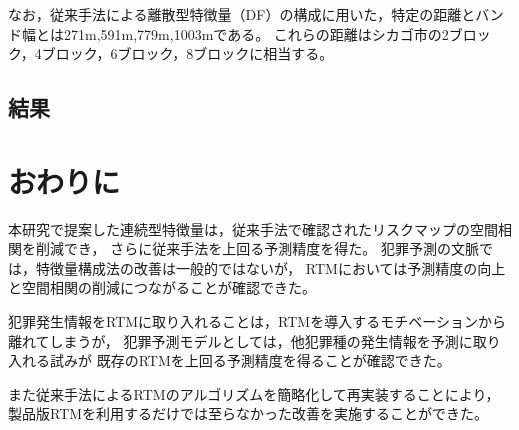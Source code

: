 なお，従来手法による離散型特徴量（DF）の構成に用いた，特定の距離とバンド幅とは271m,591m,779m,1003mである。
これらの距離はシカゴ市の2ブロック，4ブロック，6ブロック，8ブロックに相当する。
\subsection{結果}


\section{おわりに}
本研究で提案した連続型特徴量は，従来手法で確認されたリスクマップの空間相関を削減でき，
さらに従来手法を上回る予測精度を得た。
犯罪予測の文脈では，特徴量構成法の改善は一般的ではないが，
RTMにおいては予測精度の向上と空間相関の削減につながることが確認できた。

犯罪発生情報をRTMに取り入れることは，RTMを導入するモチベーションから離れてしまうが，
犯罪予測モデルとしては，他犯罪種の発生情報を予測に取り入れる試みが
既存のRTMを上回る予測精度を得ることが確認できた。

また従来手法によるRTMのアルゴリズムを簡略化して再実装することにより，
製品版RTMを利用するだけでは至らなかった改善を実施することができた。


\begin{thebibliography}{99}



\end{thebibliography}


